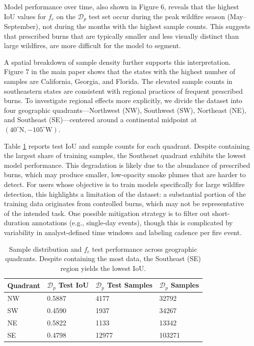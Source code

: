 \documentclass{article}
\begin{document}
Model performance over time, also shown in Figure 6, reveals that the highest IoU values for \(f_{c}\) on the \(\mathcal{D}_p\) test set occur during the peak wildfire season (May–September), not during the months with the highest sample counts. This suggests that prescribed burns that are typically smaller and less visually distinct than large wildfires, are more difficult for the model to segment.

A spatial breakdown of sample density further supports this interpretation. Figure 7 in the main paper shows that the states with the highest number of samples are California, Georgia, and Florida. The elevated sample counts in southeastern states are consistent with regional practices of frequent prescribed burns. To investigate regional effects more explicitly, we divide the dataset into four geographic quadrants—Northwest (NW), Southwest (SW), Northeast (NE), and Southeast (SE)—centered around a continental midpoint at \((40^\circ\mathrm{N}, -105^\circ\mathrm{W})\).

Table \ref{quad} reports test IoU and sample counts for each quadrant. Despite containing the largest share of training samples, the Southeast quadrant exhibits the lowest model performance. This degradation is likely due to the abundance of prescribed burns, which may produce smaller, low-opacity smoke plumes that are harder to detect. For users whose objective is to train models specifically for large wildfire detection, this highlights a limitation of the dataset: a substantial portion of the training data originates from controlled burns, which may not be representative of the intended task. One possible mitigation strategy is to filter out short-duration annotations (e.g., single-day events), though this is complicated by variability in analyst-defined time windows and labeling cadence per fire event.


\begin{table}
    \caption{Sample distribution and \(f_{c}\) test performance across geographic quadrants. Despite containing the most data, the Southeast (SE) region yields the lowest IoU.}
    \label{quad}
    \centering
    \begin{tabular}{llll}
        \toprule
        Quadrant & \(\mathcal{D}_p\) Test IoU & \(\mathcal{D}_p\) Test Samples & \(\mathcal{D}_p\) Samples \\
        \midrule
        NW & 0.5887 & 4177 & 32792\\
        SW & 0.4590 & 1937 & 34267\\
        NE & 0.5822 & 1133   & 13342\\
        SE & 0.4798 & 12977 & 103271 \\
        \bottomrule
    \end{tabular}
\end{table}
\end{document}
